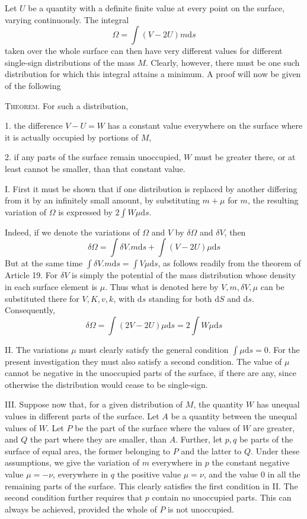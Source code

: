 Let $U$ be a quantity with a definite finite value at every point on the surface, varying continuously. The integral
\[
\Omega=\int(V-2U)m\mathrm ds
\]
taken over the whole surface can then have very different values for different single-sign distributions of the mass $M$. Clearly, however,
there must be one such distribution for which this integral attains a minimum. A proof will now be given of the following

\textsc{Theorem.} For such a distribution,

1. the difference $V-U=W$ has a constant value everywhere on the surface where it is actually occupied by portions of $M$,

2. if any parts of the surface remain unoccupied, $W$ must be greater there, or at least cannot be smaller, than that constant value.

I. First it must be shown that if one distribution is replaced by another differing from it by an infinitely small amount, by substituting $m+\mu$ for $m$, the resulting variation of $\Omega$ is expressed by $2\int W\mu\mathrm ds$.

Indeed, if we denote the variations of $\Omega$ and $V$ by $\delta\Omega$ and $\delta V$, then
\[
\delta\Omega=\int\delta V.m\mathrm ds+\int(V-2U)\mu\mathrm ds
\]
But at the same time $\int\delta V.m\mathrm ds=\int V\mu\mathrm ds$, as follows readily from the theorem of Article 19. For $\delta V$ is simply the potential of the mass distribution whose density in each surface element is $\mu$. Thus what is denoted here by $V,m,\delta V,\mu$ can be substituted there for $V,K,v,k$, with $\mathrm ds$ standing for both $\mathrm dS$ and $\mathrm ds$. Consequently,
\[
\delta\Omega=\int(2V-2U)\mu\mathrm ds=2\int W\mu\mathrm ds
\]

II. The variations $\mu$ must clearly satisfy the general condition $\int\mu\mathrm ds=0$. For the present investigation they must also satisfy a second condition. The value of $\mu$ cannot be negative in the unoccupied parts of the surface, if there are any, since otherwise the distribution would cease to be single-sign.

III. Suppose now that, for a given distribution of $M$, the quantity $W$ has unequal values in different parts of the surface. Let $A$ be a quantity between the unequal values of $W$. Let $P$ be the part of the surface where the values of $W$ are greater, and $Q$ the part where they are smaller, than $A$. Further, let $p,q$ be parts of the surface of equal area, the former belonging to $P$ and the latter to $Q$. Under these assumptions, we give the variation
of $m$ everywhere in $p$ the constant negative value $\mu=-\nu$, everywhere in $q$ the positive value $\mu=\nu$, and the value $0$ in all the remaining parts of the surface. This clearly satisfies the first condition in II. The second condition further requires that $p$ contain no unoccupied parts. This can always be achieved, provided the whole of $P$ is not unoccupied.

